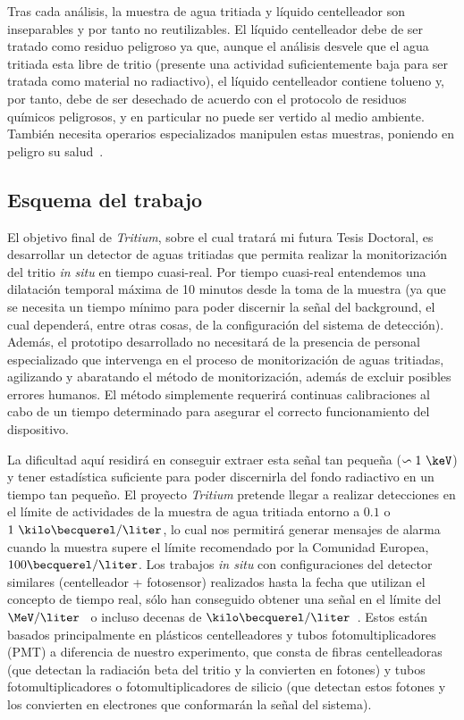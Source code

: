 Tras cada análisis, la muestra de agua tritiada y líquido centelleador son inseparables y por tanto no reutilizables.  El líquido centelleador debe de ser tratado como residuo peligroso ya que, aunque el análisis desvele que el agua tritiada esta libre de tritio (presente una actividad suficientemente baja para ser tratada como material no radiactivo), el líquido centelleador  contiene tolueno y, por tanto, debe de ser desechado de acuerdo con el protocolo de residuos químicos peligrosos, y en particular no puede ser vertido al medio ambiente. También necesita operarios especializados manipulen estas muestras, poniendo en peligro su salud~\cite{gel}.

\subsection{Esquema del trabajo}

El objetivo final de \textit{Tritium}, sobre el cual tratará mi futura Tesis Doctoral, es desarrollar un detector de aguas tritiadas que permita realizar la monitorización del tritio \textit{in situ} en tiempo cuasi-real. Por tiempo cuasi-real entendemos una dilatación temporal máxima de 10 minutos desde la toma de la muestra (ya que se necesita un tiempo mínimo para poder discernir la señal del background, el cual dependerá, entre otras cosas, de la configuración del sistema de detección). Además, el prototipo desarrollado no necesitará de la presencia de personal especializado que intervenga en el proceso de monitorización de aguas tritiadas, agilizando y abaratando el método de monitorización, además de excluir posibles errores humanos. El método simplemente requerirá continuas calibraciones al cabo de un tiempo determinado para asegurar el correcto funcionamiento del dispositivo. 

La dificultad aquí residirá en conseguir extraer esta señal tan pequeña ($\backsim 1~\keV$) y tener estadística suficiente para poder discernirla del fondo radiactivo en un tiempo tan pequeño. El proyecto \textit{Tritium} pretende llegar a realizar detecciones en el límite de actividades de la muestra de agua tritiada entorno a $0.1$ o $1~\kilo\becquerel/\liter$, lo cual nos permitirá generar mensajes de alarma cuando la muestra supere el límite recomendado por la Comunidad Europea, $100\becquerel/\liter$. Los trabajos \textit{in situ} con configuraciones del detector similares (centelleador + fotosensor) realizados hasta la fecha que utilizan el concepto de tiempo real, sólo han conseguido obtener una señal en el límite del $\MeV/\liter$~\cite{TesisTritio} o incluso decenas de $\kilo\becquerel/\liter$~\cite{Rat}. Estos están basados principalmente en plásticos centelleadores y tubos fotomultiplicadores (PMT) a diferencia de nuestro experimento, que consta de fibras centelleadoras (que detectan la radiación beta del tritio y la convierten en fotones) y tubos fotomultiplicadores o fotomultiplicadores de silicio (que detectan estos fotones y los convierten en electrones que conformarán la señal del sistema). 

